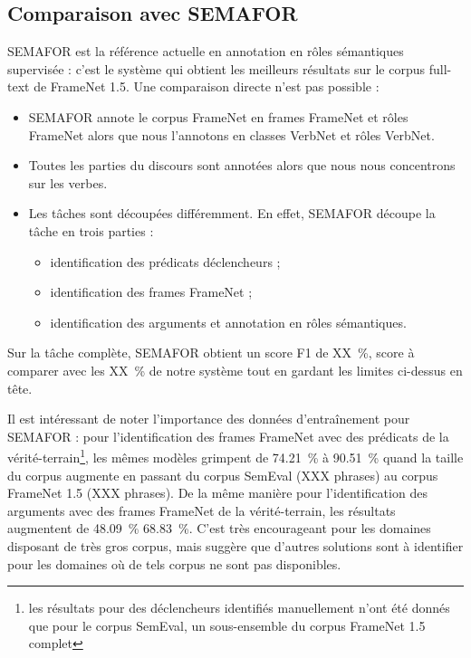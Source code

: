 \subsection{Comparaison avec SEMAFOR}

SEMAFOR \citep{das2014frame} est la référence actuelle en annotation en rôles
sémantiques supervisée : c'est le système qui obtient les meilleurs résultats
sur le corpus full-text de FrameNet 1.5. Une comparaison directe n'est pas
possible :

\begin{itemize}
    \item SEMAFOR annote le corpus FrameNet en frames FrameNet et rôles
FrameNet alors que nous l'annotons en classes VerbNet et rôles VerbNet.
    \item Toutes les parties du discours sont annotées alors que nous nous
concentrons sur les verbes.
    \item Les tâches sont découpées différemment. En effet, SEMAFOR découpe la
        tâche en trois parties :
    \begin{itemize}
        \item identification des prédicats déclencheurs ;
        \item identification des frames FrameNet ;
        \item identification des arguments et annotation en rôles sémantiques.
    \end{itemize}
\end{itemize}

Sur la tâche complète, SEMAFOR obtient un score F1 de XX~\%, score à comparer
avec les XX~\% de notre système tout en gardant les limites ci-dessus en tête. 

Il est intéressant de noter l'importance des données d'entraînement pour
SEMAFOR : pour l'identification des frames FrameNet avec des prédicats de la
vérité-terrain\footnote{les résultats pour des déclencheurs identifiés
    manuellement n'ont été donnés que pour le corpus SemEval, un sous-ensemble
du corpus FrameNet 1.5 complet}, les mêmes modèles grimpent de 74.21~\% à
90.51~\% quand la taille du corpus augmente en passant du corpus SemEval (XXX
phrases) au corpus FrameNet 1.5 (XXX phrases).  De la même manière pour
l'identification des arguments avec des frames FrameNet de la vérité-terrain,
les résultats augmentent de 48.09~\% 68.83~\%. C'est très encourageant pour les
domaines disposant de très gros corpus, mais suggère que d'autres solutions
sont à identifier pour les domaines où de tels corpus ne sont pas disponibles.


